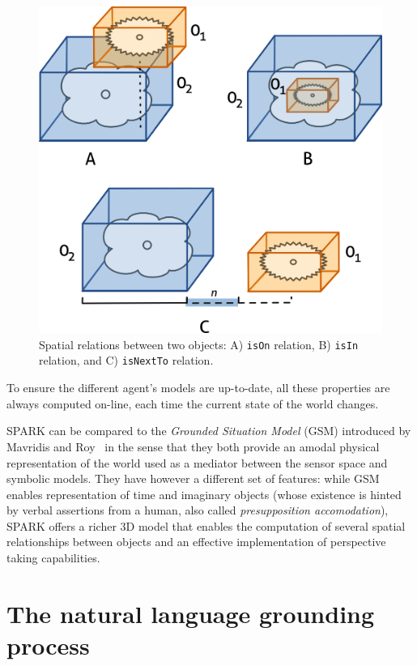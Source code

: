 \documentclass[twocolumn]{svjour3}
\newcommand{\concept}[1]{{\footnotesize \texttt{#1}}}
\begin{document}
\begin{itemize}
\begin{itemize}
\begin{figure} 
	\centering
	\includegraphics[width=0.8\columnwidth]{images/spatial_relation.png}
	\caption{Spatial relations between two objects: A) \concept{isOn} relation, 
	B) \concept{isIn} relation, and C) \concept{isNextTo} relation.} 
	\label{fig::sprelation} 
\end{figure}

\end{itemize} 
\end{itemize}

To ensure the different agent's models are up-to-date, all these properties are
always computed on-line, each time the current state of the world changes.

SPARK can be compared to the \emph{Grounded Situation Model} (GSM) introduced
by Mavridis and Roy~\cite{Mavridis2005} in the sense that they both provide an
amodal physical representation of the world used as a mediator between the
sensor space and symbolic models. They have however a different set of
features: while GSM enables representation of time and imaginary objects (whose
existence is hinted by verbal assertions from a human, also called
\emph{presupposition accomodation}), SPARK offers a richer 3D model that
enables the computation of several spatial relationships between
objects and an effective implementation of perspective taking capabilities.

\section{The natural language grounding process}
\label{dialog}
\end{document}
